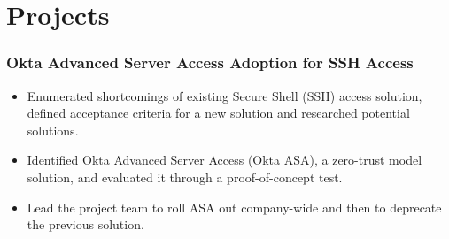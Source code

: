 \documentclass[letterpaper]{article}
\begin{document}
\section*{Projects}
\subsubsection*{Okta Advanced Server Access Adoption for SSH Access}
\begin{itemize}[noitemsep]
	\item Enumerated shortcomings of existing Secure Shell (SSH) access solution, defined acceptance criteria for a new solution and researched potential solutions.
	\item Identified Okta Advanced Server Access (Okta ASA), a zero-trust model solution, and evaluated it through a proof-of-concept test.
	\item Lead the project team to roll ASA out company-wide and then to deprecate the previous solution.
\end{itemize}
\end{document}

